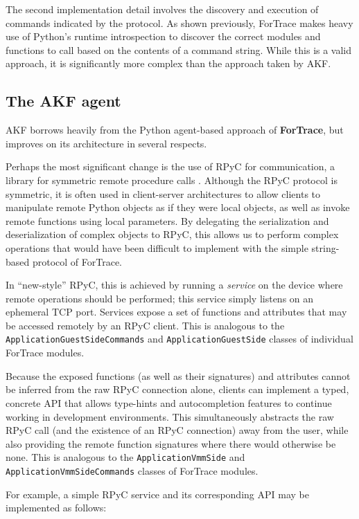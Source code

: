 \documentclass[letterpaper,12pt]{report}
\begin{document}
The second implementation detail involves the discovery and execution of
commands indicated by the protocol. As shown previously, ForTrace makes
heavy use of Python's runtime introspection to discover the correct
modules and functions to call based on the contents of a command string.
While this is a valid approach, it is significantly more complex than
the approach taken by AKF.

\subsection{The AKF agent}\label{the-akf-agent}

AKF borrows heavily from the Python agent-based approach of
\textbf{ForTrace}, but improves on its architecture in several respects.

Perhaps the most significant change is the use of RPyC for
communication, a library for symmetric remote procedure calls
\cite{TomerfilibaorgRpyc2025}. Although the RPyC protocol is
symmetric, it is often used in client-server architectures to allow
clients to manipulate remote Python objects as if they were local
objects, as well as invoke remote functions using local parameters. By
delegating the serialization and deserialization of complex objects to
RPyC, this allows us to perform complex operations that would have been
difficult to implement with the simple string-based protocol of
ForTrace.

In ``new-style'' RPyC, this is achieved by running a \emph{service} on
the device where remote operations should be performed; this service
simply listens on an ephemeral TCP port. Services expose a set of
functions and attributes that may be accessed remotely by an RPyC
client. This is analogous to the \texttt{ApplicationGuestSideCommands}
and \texttt{ApplicationGuestSide} classes of individual ForTrace
modules.

Because the exposed functions (as well as their signatures) and
attributes cannot be inferred from the raw RPyC connection alone,
clients can implement a typed, concrete API that allows type-hints and
autocompletion features to continue working in development environments.
This simultaneously abstracts the raw RPyC call (and the existence of an
RPyC connection) away from the user, while also providing the remote
function signatures where there would otherwise be none. This is
analogous to the \texttt{ApplicationVmmSide} and
\texttt{ApplicationVmmSideCommands} classes of ForTrace modules.

For example, a simple RPyC service and its corresponding API may be
implemented as follows:
\end{document}
